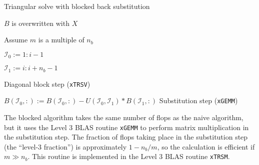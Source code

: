 \documentclass{article}
\begin{document}
\begin{algorithm}[H]
  \caption{Triangular solve with blocked back substitution}
  \label{algorithm:trsm}
  \begin{algorithmic}
    \Comment \(B\) is overwritten with \(X\)

     \Comment Assume \(m\) is a multiple of
    \(n_b\)

    \State \( \mathcal{I}_0 := 1:i-1 \)

    \State \( \mathcal{I}_1 := i:i+n_b-1\)
    

    \State {} 
    \Comment Diagonal block step (\texttt{xTRSV})

    \EndFor

    \State \( B(\mathcal{I}_0,:) := B(\mathcal{I}_0,:) - U(\mathcal{I}_0,\mathcal{I}_1) * B(\mathcal{I}_1,:) \)
    \Comment Substitution step (\texttt{xGEMM})

    \EndFor

    \EndProcedure
  \end{algorithmic}
\end{algorithm}
\noindent
The blocked algorithm takes the same number of flops as the naive
algorithm, but it uses the Level 3 BLAS routine \texttt{xGEMM} to
perform matrix multiplication in the substitution step.  The fraction
of flops taking place in the substitution step (the ``level-3
fraction'') is approximately \(1-n_b/m\), so the calculation is
efficient if \(m\gg n_b\). This routine is implemented in the Level 3
BLAS routine \texttt{xTRSM}.
\end{document}
